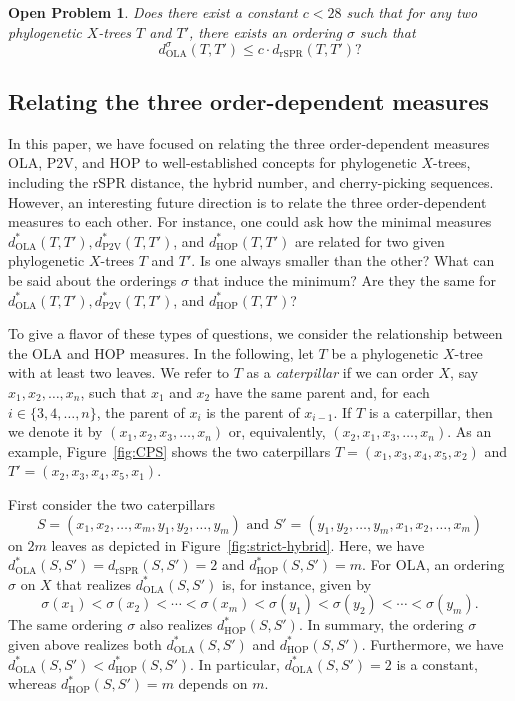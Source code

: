 \documentclass{article}
\newtheorem{problem}{Open Problem}
\newcommand{\rSPR}{\mathrm{rSPR}}
\newcommand{\HOP}{\mathrm{HOP}}
\newcommand{\OLA}{\mathrm{OLA}}
\newcommand{\PV}{\mathrm{P2V}}
\begin{document}
\begin{problem} Does there exist a constant $c<28$ such that for any two phylogenetic $X$-trees $T$ and $T'$, there exists an ordering $\sigma$ such that
$$
d_\OLA^\sigma(T,T') \leq c\cdot d_\rSPR(T,T')?
$$
\end{problem}

\subsection*{Relating the three order-dependent measures}
In this paper, we have focused on relating the three order-dependent measures OLA, P2V, and HOP to well-established concepts for phylogenetic $X$-trees, including the rSPR distance, the hybrid number, and cherry-picking sequences. However, an interesting future direction is to relate the three order-dependent measures to each other. For instance, one could ask how the minimal measures $d^\ast_\OLA(T,T'), d^\ast_\PV(T,T')$, and $d^\ast_\HOP(T,T')$ are related for two given phylogenetic $X$-trees $T$ and $T'$. Is one always smaller than the other? What can be said about the orderings $\sigma$ that induce the minimum? Are they the same for $d^\ast_\OLA(T,T'), d^\ast_\PV(T,T')$, and $d^\ast_\HOP(T,T')$?

To give a flavor of these types of questions, we consider the relationship between the OLA and HOP measures. In the following, let $T$ be a phylogenetic $X$-tree with at least two leaves. We refer to $T$ as a \emph{caterpillar} if we can order $X$, say $x_1,x_2,\ldots,x_n$, such that  $x_1$ and $x_2$ have the same parent and, for each $i\in\{3,4,\ldots,n\}$, the parent of $x_i$ is the parent of $x_{i-1}$. If $T$ is a caterpillar, then we denote it by $(x_1,x_2,x_3,\ldots,x_n)$ or, equivalently,  $(x_2,x_1,x_3,\ldots,x_n)$. As an example, Figure~\ref{fig:CPS} shows the two caterpillars $T = (x_1, x_3, x_4, x_5, x_2)$ and $T' = (x_2, x_3, x_4, x_5, x_1)$.

First consider the two caterpillars 
$$S = (x_1, x_2, \ldots, x_m, y_1, y_2, \ldots, y_m)
\mbox{ and } 
S' = (y_1, y_2, \ldots, y_{m}, x_1, x_2, \ldots, x_{m})$$ on $2m$ leaves as depicted in Figure~\ref{fig:strict-hybrid}. 
Here, we have $d^*_\OLA(S,S') = d_{\rSPR}(S,S') = 2$ and $d^*_\HOP(S,S') = m$. For OLA, an ordering $\sigma$ on $X$ that realizes $d^*_\OLA(S,S')$ is, for instance, given by
\[ \sigma(x_1) < \sigma(x_2) < \cdots < \sigma(x_{m}) < \sigma(y_1) < \sigma(y_2) < \cdots < \sigma(y_{m}).\]
The same ordering $\sigma$ also realizes $d^*_\HOP(S,S')$.
In summary, the ordering $\sigma$ given above realizes both  $d^*_\OLA(S,S')$ and $ d^*_\HOP(S,S')$. Furthermore, we have $d^*_\OLA(S,S') < d^*_\HOP(S,S')$. In particular, $d^*_\OLA(S,S') = 2$ is a constant, whereas $d^*_\HOP(S,S') = m$ depends on $m$.
\end{document}
